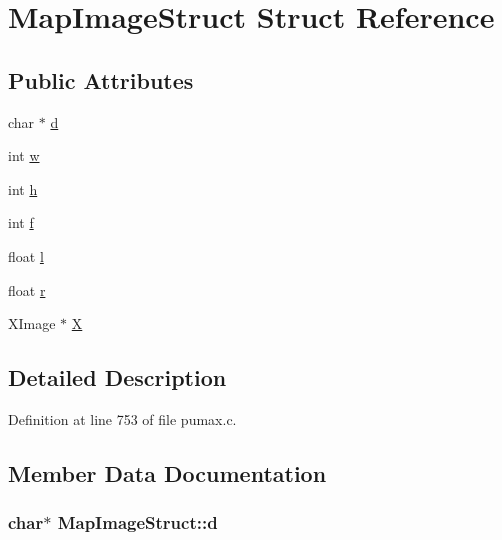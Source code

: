 \hypertarget{struct_map_image_struct}{
\section{\-Map\-Image\-Struct \-Struct \-Reference}
\label{struct_map_image_struct}
}
\subsection*{\-Public \-Attributes}
\begin{DoxyCompactItemize}
\item 
char $\ast$ \hyperlink{struct_map_image_struct_aef0d9e2ef28e765f15559ff077d9fe26}{d}
\item 
int \hyperlink{struct_map_image_struct_a231ed4c4f5df4b3c414fe643d139bea8}{w}
\item 
int \hyperlink{struct_map_image_struct_a7c1e3b72791d55ecbe02d3325a69f882}{h}
\item 
int \hyperlink{struct_map_image_struct_a7c3018a3883c438e08c5632a49e39c66}{f}
\item 
float \hyperlink{struct_map_image_struct_a46fe3297a24177fa1aef6e5cf19a4b4b}{l}
\item 
float \hyperlink{struct_map_image_struct_a0c135dc0852d411fd87b7ac84ba55664}{r}
\item 
\-X\-Image $\ast$ \hyperlink{struct_map_image_struct_aaa7ba55126fe38d8113c9143d2528560}{\-X}
\end{DoxyCompactItemize}


\subsection{\-Detailed \-Description}


\-Definition at line 753 of file pumax.\-c.



\subsection{\-Member \-Data \-Documentation}
\hypertarget{struct_map_image_struct_aef0d9e2ef28e765f15559ff077d9fe26}{
\subsubsection[{d}]{\setlength{\rightskip}{0pt plus 5cm}char$\ast$ {\bf \-Map\-Image\-Struct\-::d}}}
\label{struct_map_image_struct_aef0d9e2ef28e765f15559ff077d9fe26}


